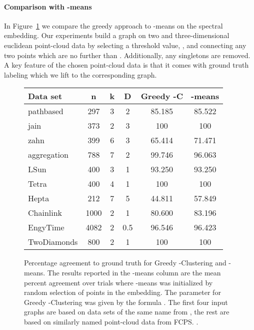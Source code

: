 \documentclass[11pt]{article}
\theoremstyle{plain}
\begin{document}
\paragraph*{Comparison with -means}
In Figure~\ref{fig:expresults} we compare the greedy approach to -means on
the spectral embedding. Our experiments build a graph on two and
three-dimensional euclidean point-cloud data by selecting a threshold value,
, and connecting any two points which are no further than . Additionally,
any singletons are removed. A key feature of the chosen point-cloud data is that
it comes with ground truth labeling which we lift to the corresponding
graph.

\begin{figure}
\begin{center}
\begin{tabular}{ l | c c c c c }
  Data set     &  n   & k & D   & Greedy -C & -means	\\
\hline
  pathbased   & 297  & 3 & 2   & 85.185     & 85.522        \\
  jain        & 373  & 2 & 3   & 100        & 100           \\
  zahn        & 399  & 6 & 3   & 65.414     & 71.471        \\
  aggregation & 788  & 7 & 2   & 99.746     & 96.063        \\
  LSun        & 400  & 3 & 1   & 93.250     & 93.250        \\
  Tetra       & 400  & 4 & 1   & 100        & 100           \\
  Hepta       & 212  & 7 & 5   & 44.811     & 57.849        \\
  Chainlink   & 1000 & 2 & 1   & 80.600     & 83.196        \\
  EngyTime\footnotemark
              & 4082 & 2 & 0.5 & 96.546     & 96.423        \\
  TwoDiamonds & 800  & 2 & 1   & 100        & 100           \\
\end{tabular}
\end{center}
\caption{Percentage agreement to ground truth for Greedy -Clustering and
-means. The results reported in the -means column are the mean percent
agreement over  trials where -means was initialized by random selection
of  points in the embedding. The  parameter for Greedy -Clustering was
given by the formula . The first four input
graphs are based on data sets of the same name from \cite{dataset:shapesets},
the rest are based on similarly named point-cloud data from FCPS.
\cite{dataset:FCPS}. \label{fig:expresults}}
\end{figure}
\end{document}
